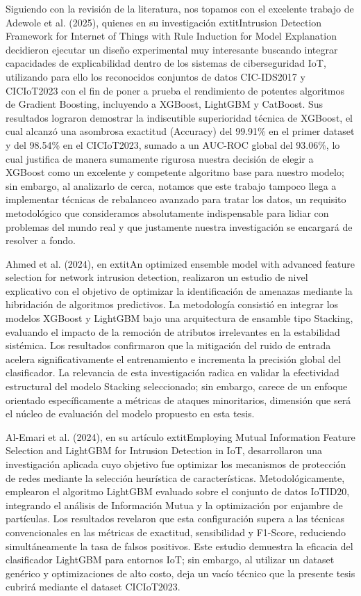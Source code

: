 Siguiendo con la revisión de la literatura, nos topamos con el excelente trabajo de Adewole et al. (2025), quienes en su investigación 	extit{Intrusion Detection Framework for Internet of Things with Rule Induction for Model Explanation} decidieron ejecutar un diseño experimental muy interesante buscando integrar capacidades de explicabilidad dentro de los sistemas de ciberseguridad IoT, utilizando para ello los reconocidos conjuntos de datos CIC-IDS2017 y CICIoT2023 con el fin de poner a prueba el rendimiento de potentes algoritmos de Gradient Boosting, incluyendo a XGBoost, LightGBM y CatBoost. Sus resultados lograron demostrar la indiscutible superioridad técnica de XGBoost, el cual alcanzó una asombrosa exactitud (Accuracy) del 99.91\% en el primer dataset y del 98.54\% en el CICIoT2023, sumado a un AUC-ROC global del 93.06\%, lo cual justifica de manera sumamente rigurosa nuestra decisión de elegir a XGBoost como un excelente y competente algoritmo base para nuestro modelo; sin embargo, al analizarlo de cerca, notamos que este trabajo tampoco llega a implementar técnicas de rebalanceo avanzado para tratar los datos, un requisito metodológico que consideramos absolutamente indispensable para lidiar con problemas del mundo real y que justamente nuestra investigación se encargará de resolver a fondo.

Ahmed et al. (2024), en 	extit{An optimized ensemble model with advanced feature selection for network intrusion detection}, realizaron un estudio de nivel explicativo con el objetivo de optimizar la identificación de amenazas mediante la hibridación de algoritmos predictivos. La metodología consistió en integrar los modelos XGBoost y LightGBM bajo una arquitectura de ensamble tipo Stacking, evaluando el impacto de la remoción de atributos irrelevantes en la estabilidad sistémica. Los resultados confirmaron que la mitigación del ruido de entrada acelera significativamente el entrenamiento e incrementa la precisión global del clasificador. La relevancia de esta investigación radica en validar la efectividad estructural del modelo Stacking seleccionado; sin embargo, carece de un enfoque orientado específicamente a métricas de ataques minoritarios, dimensión que será el núcleo de evaluación del modelo propuesto en esta tesis.

Al-Emari et al. (2024), en su artículo 	extit{Employing Mutual Information Feature Selection and LightGBM for Intrusion Detection in IoT}, desarrollaron una investigación aplicada cuyo objetivo fue optimizar los mecanismos de protección de redes mediante la selección heurística de características. Metodológicamente, emplearon el algoritmo LightGBM evaluado sobre el conjunto de datos IoTID20, integrando el análisis de Información Mutua y la optimización por enjambre de partículas. Los resultados revelaron que esta configuración supera a las técnicas convencionales en las métricas de exactitud, sensibilidad y F1-Score, reduciendo simultáneamente la tasa de falsos positivos. Este estudio demuestra la eficacia del clasificador LightGBM para entornos IoT; sin embargo, al utilizar un dataset genérico y optimizaciones de alto costo, deja un vacío técnico que la presente tesis cubrirá mediante el dataset CICIoT2023.

